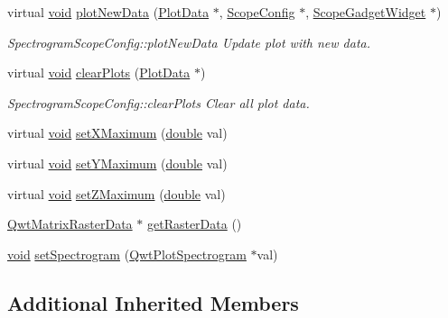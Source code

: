 \begin{DoxyCompactItemize}
virtual \hyperlink{group___u_a_v_objects_plugin_ga444cf2ff3f0ecbe028adce838d373f5c}{void} \hyperlink{group___scope_plugin_gadfdece3155868e0a61b6a481a663be74}{plot\-New\-Data} (\hyperlink{class_plot_data}{Plot\-Data} $\ast$, \hyperlink{class_scope_config}{Scope\-Config} $\ast$, \hyperlink{class_scope_gadget_widget}{Scope\-Gadget\-Widget} $\ast$)
\begin{DoxyCompactList}\small\item\em Spectrogram\-Scope\-Config\-::plot\-New\-Data Update plot with new data. \end{DoxyCompactList}\item 
virtual \hyperlink{group___u_a_v_objects_plugin_ga444cf2ff3f0ecbe028adce838d373f5c}{void} \hyperlink{group___scope_plugin_ga3976392eaccf049644001f3e6c7596ad}{clear\-Plots} (\hyperlink{class_plot_data}{Plot\-Data} $\ast$)
\begin{DoxyCompactList}\small\item\em Spectrogram\-Scope\-Config\-::clear\-Plots Clear all plot data. \end{DoxyCompactList}\item 
virtual \hyperlink{group___u_a_v_objects_plugin_ga444cf2ff3f0ecbe028adce838d373f5c}{void} \hyperlink{group___scope_plugin_ga47ae0c37eea393bc7c83907b6fceb173}{set\-X\-Maximum} (\hyperlink{_super_l_u_support_8h_a8956b2b9f49bf918deed98379d159ca7}{double} val)
\item 
virtual \hyperlink{group___u_a_v_objects_plugin_ga444cf2ff3f0ecbe028adce838d373f5c}{void} \hyperlink{group___scope_plugin_ga1379bb89fb91d5f6c894fbf000c65cae}{set\-Y\-Maximum} (\hyperlink{_super_l_u_support_8h_a8956b2b9f49bf918deed98379d159ca7}{double} val)
\item 
virtual \hyperlink{group___u_a_v_objects_plugin_ga444cf2ff3f0ecbe028adce838d373f5c}{void} \hyperlink{group___scope_plugin_ga90a7b5815000fba373fc23d13506ce5f}{set\-Z\-Maximum} (\hyperlink{_super_l_u_support_8h_a8956b2b9f49bf918deed98379d159ca7}{double} val)
\item 
\hyperlink{class_qwt_matrix_raster_data}{Qwt\-Matrix\-Raster\-Data} $\ast$ \hyperlink{group___scope_plugin_ga6373cb623e2b93290e6251c913a3330f}{get\-Raster\-Data} ()
\item 
\hyperlink{group___u_a_v_objects_plugin_ga444cf2ff3f0ecbe028adce838d373f5c}{void} \hyperlink{group___scope_plugin_ga357b6fb785d9356c39fe80f5f1a7d88f}{set\-Spectrogram} (\hyperlink{class_qwt_plot_spectrogram}{Qwt\-Plot\-Spectrogram} $\ast$val)
\end{DoxyCompactItemize}
\subsection*{Additional Inherited Members}


